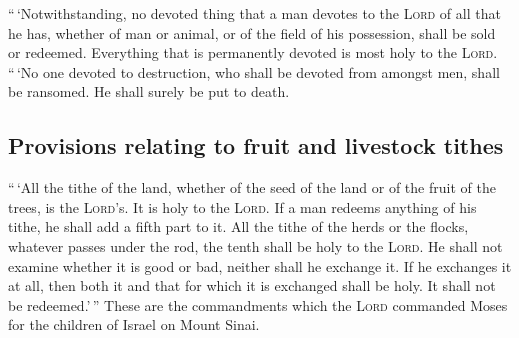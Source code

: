  ``\,`Notwithstanding, no devoted thing that a man
devotes to the \textsc{Lord} of all that he has, whether of man or
animal, or of the field of his possession, shall be sold or redeemed.
Everything that is permanently devoted is most holy to the
\textsc{Lord}.  ``\,`No one devoted to destruction, who
shall be devoted from amongst men, shall be ransomed. He shall surely be
put to death.

\hypertarget{provisions-relating-to-fruit-and-livestock-tithes}{%
\subsection{Provisions relating to fruit and livestock
tithes}\label{provisions-relating-to-fruit-and-livestock-tithes}}

 ``\,`All the tithe of the land, whether of the seed of
the land or of the fruit of the trees, is the \textsc{Lord}'s. It is
holy to the \textsc{Lord}.  If a man redeems anything of
his tithe, he shall add a fifth part to it.  All the
tithe of the herds or the flocks, whatever passes under the rod, the
tenth shall be holy to the \textsc{Lord}.  He shall not
examine whether it is good or bad, neither shall he exchange it. If he
exchanges it at all, then both it and that for which it is exchanged
shall be holy. It shall not be redeemed.'\,''  These are
the commandments which the \textsc{Lord} commanded Moses for the
children of Israel on Mount Sinai.
